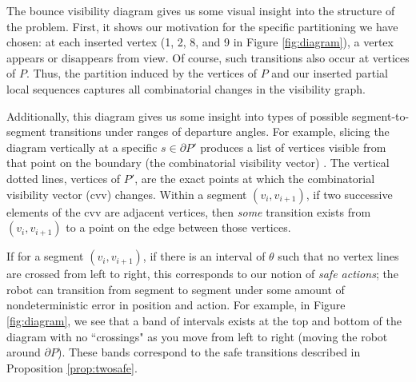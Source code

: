 \documentclass[]{styles/svproc}  %
\begin{document}
The bounce visibility diagram gives us some visual insight into the structure of
the problem. First, it shows our motivation for the specific partitioning we
have chosen: at each inserted vertex (1, 2, 8, and 9 in Figure
\ref{fig:diagram}), a vertex appears or disappears from view. Of course, such
transitions also occur at vertices of $P$. Thus, the partition induced by the
vertices of $P$ and our inserted partial local sequences captures all
combinatorial changes in the visibility graph.

Additionally, this diagram gives us some insight into types of possible
segment-to-segment transitions under ranges of departure angles. 
For example, slicing the diagram vertically at a specific $s \in \partial P'$
produces a list of vertices visible from that point on the boundary (the
combinatorial visibility vector) \cite{suri2008simple}. The vertical dotted
lines, vertices of $P'$, are the exact points at which the combinatorial visibility
vector (cvv) changes. Within a segment $(v_i, v_{i+1})$, if two successive elements of the cvv are 
adjacent vertices, then \emph{some} transition exists from
$(v_i, v_{i+1})$ to a point on the edge between those vertices.

If for a segment $(v_i, v_{i+1})$, if there is an interval of $\theta$ such that
no vertex lines are crossed from left to right, this corresponds to our notion
of \emph{safe actions}; the robot can transition from segment to segment under
some amount of nondeterministic error in position and action.
For example, in
Figure \ref{fig:diagram}, we see that a band of intervals exists at the top and
bottom of the diagram with no ``crossings" as you move from left to right
(moving the robot around $\partial P$). These bands correspond to the safe
transitions described in Proposition \ref{prop:twosafe}.

%
\end{document}
